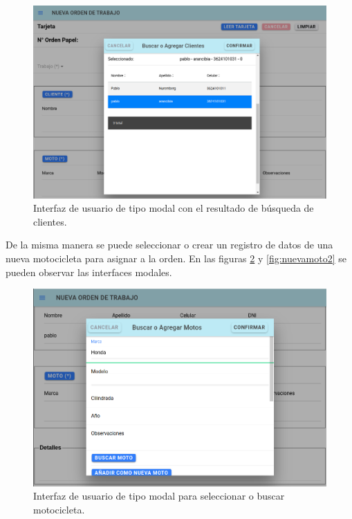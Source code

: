 \begin{figure}[H]
	\centering
	\includegraphics[scale=.30]{./Figures/nueva-clientes-2.png}
	\caption{Interfaz de usuario de tipo modal con el resultado de búsqueda de clientes.}
	\label{fig:nuevacliente2}
\end{figure}

De la misma manera se puede seleccionar o crear un registro de datos de una nueva motocicleta para asignar a la orden. En las figuras \ref{fig:nuevamoto1} y \ref{fig:nuevamoto2} se pueden observar las interfaces modales.


\begin{figure}[H]
	\centering
	\includegraphics[scale=.35]{./Figures/nueva-moto-1.png}
	\caption{Interfaz de usuario de tipo modal para seleccionar o buscar motocicleta.}
	\label{fig:nuevamoto1}
\end{figure}

